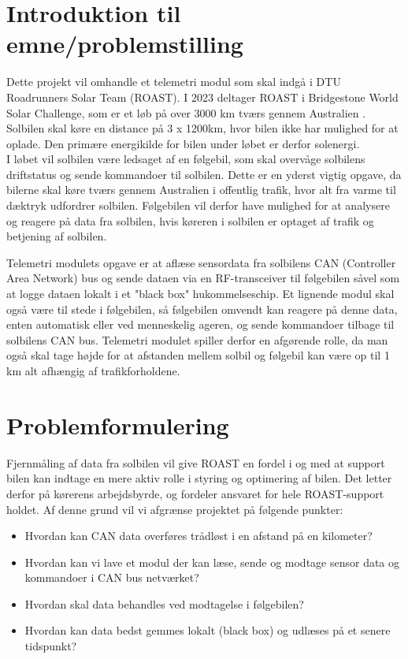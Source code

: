 \documentclass[]{article}
\begin{document}
\section{Introduktion til emne/problemstilling}

Dette projekt vil omhandle et telemetri modul som skal indgå i DTU Roadrunners Solar Team (ROAST). I 2023 deltager ROAST i Bridgestone World Solar Challenge, som er et løb på over 3000 km tværs gennem Australien \cite{wsc}. Solbilen skal køre en distance på 3 x 1200km, hvor bilen ikke har mulighed for at oplade. Den primære energikilde for bilen under løbet er derfor solenergi.\\
I løbet vil solbilen være ledsaget af en følgebil, som skal overvåge solbilens driftstatus og sende kommandoer til solbilen. Dette er en yderst vigtig opgave, da bilerne skal køre tværs gennem Australien i offentlig trafik, hvor alt fra varme til dæktryk udfordrer solbilen. Følgebilen vil derfor have mulighed for at analysere og reagere på data fra solbilen, hvis køreren i solbilen er optaget af trafik og betjening af solbilen.


Telemetri modulets opgave er at aflæse sensordata fra solbilens CAN (Controller Area Network) bus og sende dataen via en RF-transceiver til følgebilen såvel som at logge dataen lokalt i et "black box" hukommelseschip. Et lignende modul skal også være til stede i følgebilen, så følgebilen omvendt kan reagere på denne data, enten automatisk eller ved menneskelig ageren, og sende kommandoer tilbage til solbilens CAN bus. Telemetri modulet spiller derfor en afgørende rolle, da man også skal tage højde for at afstanden mellem solbil og følgebil kan være op til 1 km alt afhængig af trafikforholdene.

\section{Problemformulering}
Fjernmåling af data fra solbilen vil give ROAST en fordel i og med at support bilen kan indtage en mere aktiv rolle i styring og optimering af bilen. Det letter derfor på kørerens arbejdsbyrde, og fordeler ansvaret for hele ROAST-support holdet. Af denne grund vil vi afgrænse projektet på følgende punkter: 
\begin{itemize}
    \item Hvordan kan CAN data overføres trådløst i en afstand på en kilometer?
    \item Hvordan kan vi lave et modul der kan læse, sende og modtage sensor data og kommandoer i CAN bus netværket?
    \item Hvordan skal data behandles ved modtagelse i følgebilen?
    \item Hvordan kan data bedst gemmes lokalt (black box) og udlæses på et senere tidspunkt?
\end{itemize}
\end{document}
